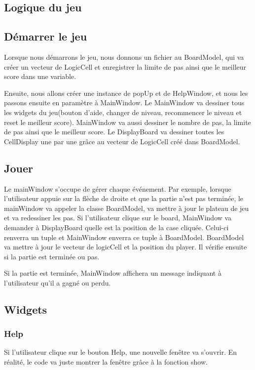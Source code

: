 \documentclass[utf8]{article}
\begin{document}
\begin{large}
\section{Logique du jeu}
\subsection{Démarrer le jeu}
\indent
\par

Lorsque nous démarrons le jeu, nous donnons un fichier au BoardModel, qui va
créer un vecteur de LogicCell et enregistrer la limite de pas ainsi que le
meilleur score dans une variable.
\par
Ensuite, nous allons créer une instance de popUp et de HelpWindow, et nous les
passons ensuite en paramètre à MainWindow. Le MainWindow va dessiner tous les
widgets du jeu(bouton d'aide, changer de niveau, recommencer le niveau et reset
le meilleur score). MainWindow va aussi dessiner le nombre de pas, la limite de
pas ainsi que le meilleur score. Le DisplayBoard va dessiner toutes les
CellDisplay une par une grâce au vecteur de LogicCell créé dans BoardModel.


\par
\subsection{Jouer}
\indent
\par
Le mainWindow s'occupe de gérer chaque événement. Par exemple, lorsque
l'utilisateur appuie sur la flèche de droite et que la partie n'est pas
terminée, le mainWindow va appeler la classe BoardModel, va mettre à jour le
plateau de jeu et va redessiner les pas. Si l'utilisateur clique sur le board,
MainWindow va demander à DisplayBoard quelle est la position de la case cliquée.
Celui-ci renverra un tuple et MainWindow enverra ce tuple à BoardModel.
BoardModel va mettre à jour le vecteur de logicCell et la position du player. Il
vérifie ensuite si la partie est terminée ou pas.
\par
Si la partie est terminée, MainWindow affichera un message indiquant à
l'utilisateur qu'il a gagné ou perdu.
\par

\subsection{Widgets}
\subsubsection{Help}
\indent
\par
Si l'utilisateur clique sur le bouton Help, une nouvelle fenêtre va s'ouvrir. En
réalité, le code va juste montrer la fenêtre grâce à la fonction show.
\par

\end{large}
\end{document}
